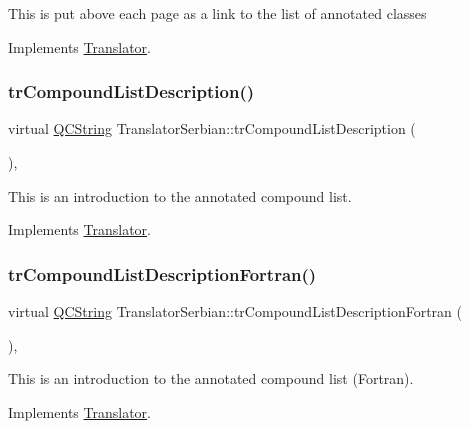 This is put above each page as a link to the list of annotated classes 

Implements \mbox{\hyperlink{class_translator}{Translator}}.

\mbox{\label{class_translator_serbian_ac42d5075faa1fd99f9fdbfec79dc8260}} 
\subsubsection{\texorpdfstring{trCompoundListDescription()}{trCompoundListDescription()}}
{\footnotesize\ttfamily virtual \mbox{\hyperlink{class_q_c_string}{Q\+C\+String}} Translator\+Serbian\+::tr\+Compound\+List\+Description (\begin{DoxyParamCaption}{ }\end{DoxyParamCaption})\hspace{0.3cm}{\ttfamily [inline]}, {\ttfamily [virtual]}}

This is an introduction to the annotated compound list. 

Implements \mbox{\hyperlink{class_translator}{Translator}}.

\mbox{\label{class_translator_serbian_a4fa1e4eb298b396c62a1f0fa91b8799b}} 
\subsubsection{\texorpdfstring{trCompoundListDescriptionFortran()}{trCompoundListDescriptionFortran()}}
{\footnotesize\ttfamily virtual \mbox{\hyperlink{class_q_c_string}{Q\+C\+String}} Translator\+Serbian\+::tr\+Compound\+List\+Description\+Fortran (\begin{DoxyParamCaption}{ }\end{DoxyParamCaption})\hspace{0.3cm}{\ttfamily [inline]}, {\ttfamily [virtual]}}

This is an introduction to the annotated compound list (Fortran). 

Implements \mbox{\hyperlink{class_translator}{Translator}}.

